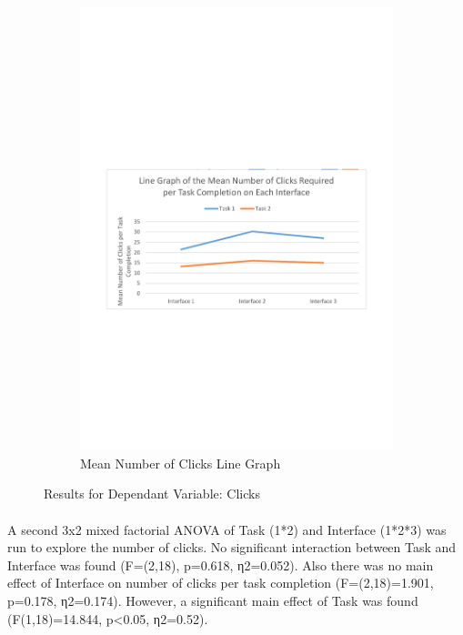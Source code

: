 \documentclass{l4proj}
\begin{document}
\begin{figure}[H]
\begin{subfigure}{.5\textwidth}
		\includegraphics[width=\textwidth]{charts/table4.pdf}
		\caption{Mean Number of Clicks Line Graph}
		\label{ch:meanclicklinegraph}
	\end{subfigure}
	\caption{Results for Dependant Variable: Clicks}
	\label{fig:clicks}
\end{figure}
\paragraph{}
A second 3x2 mixed factorial ANOVA of Task (1*2) and Interface (1*2*3) was run to explore the number of clicks. No significant interaction between Task and Interface was found (F=(2,18), p=0.618, η2=0.052). Also there was no main effect of Interface on number of clicks per task completion (F=(2,18)=1.901, p=0.178, η2=0.174). However, a significant main effect of Task was found (F(1,18)=14.844, p<0.05, η2=0.52). 
\end{document}
